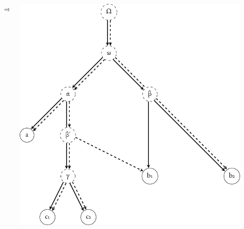 \documentclass[10pt]{beamer}
\begin{document}
\begin{frame}
\begin{center}
\begin{columns}
\begin{column}{0.3\textwidth}
				\end{column}
				\begin{column}{0.1\textwidth}
					\centering
					$\Rightarrow$
				\end{column}
				\begin{column}{0.5\textwidth}
					\centering
					\includegraphics[scale=0.5]{../img/stemma-rooted-contamination.pdf}
				\end{column}
			\end{columns}
		\end{center}
	\end{frame}
\end{document}
